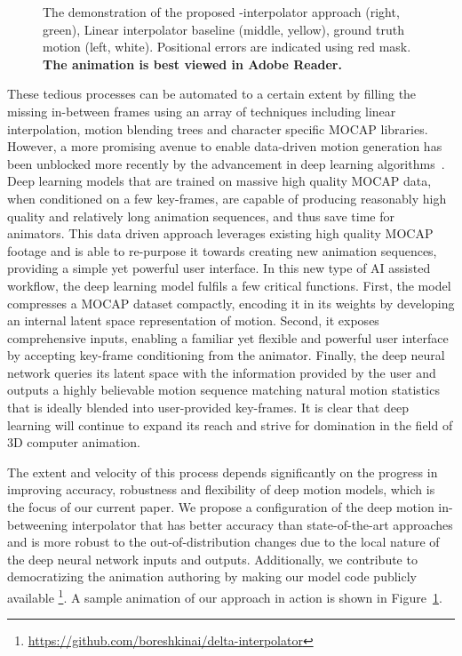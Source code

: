 \documentclass[letterpaper]{article} \usepackage[]{aaai23}  \usepackage{times}  \usepackage{helvet}  \usepackage{courier}  \usepackage[hyphens]{url}  \usepackage{graphicx} \urlstyle{rm} \def\UrlFont{\rm}  \usepackage{natbib}  \usepackage{caption} \frenchspacing  \setlength{\pdfpagewidth}{8.5in} \setlength{\pdfpageheight}{11in}
\begin{document}
\begin{figure}[ht]
    \centering
    \caption{The demonstration of the proposed -interpolator approach (right, green), Linear interpolator baseline (middle, yellow), ground truth motion (left, white). Positional errors are indicated using red mask. \textbf{The animation is best viewed in Adobe Reader.}}
    \label{fig:animation_demo}
\end{figure}



These tedious processes can be automated to a certain extent by filling the missing in-between frames using an array of techniques including linear interpolation, motion blending trees and character specific MOCAP libraries. However, a more promising avenue to enable data-driven motion generation has been unblocked more recently by the advancement in deep learning algorithms~\cite{harvey2020robust,duan2021singleshot}. Deep learning models that are trained on massive high quality MOCAP data, when conditioned on a few key-frames, are capable of producing reasonably high quality and relatively long animation sequences, and thus save time for animators. This data driven approach leverages existing high quality MOCAP footage and is able to re-purpose it towards creating new animation sequences, providing a simple yet powerful user interface. In this new type of AI assisted workflow, the deep learning model fulfils a few critical functions. First, the model compresses a MOCAP dataset compactly, encoding it in its weights by developing an internal latent space representation of motion. Second, it exposes comprehensive inputs, enabling a familiar yet flexible and powerful user interface by accepting key-frame conditioning from the animator. Finally, the deep neural network queries its latent space with the information provided by the user and outputs a highly believable motion sequence matching natural motion statistics that is ideally blended into user-provided key-frames. It is clear that deep learning will continue to expand its reach and strive for domination in the field of 3D computer animation. 

The extent and velocity of this process depends significantly on the progress in improving accuracy, robustness and flexibility of deep motion models, which is the focus of our current paper. We propose a configuration of the deep motion in-betweening interpolator that has better accuracy than state-of-the-art approaches and is more robust to the out-of-distribution changes due to the local nature of the deep neural network inputs and outputs. 
Additionally, we contribute to democratizing the animation authoring by making our model code publicly available
\footnote{\url{https://github.com/boreshkinai/delta-interpolator}}.
A sample animation of our approach in action is shown in Figure~\ref{fig:animation_demo}.
\end{document}
